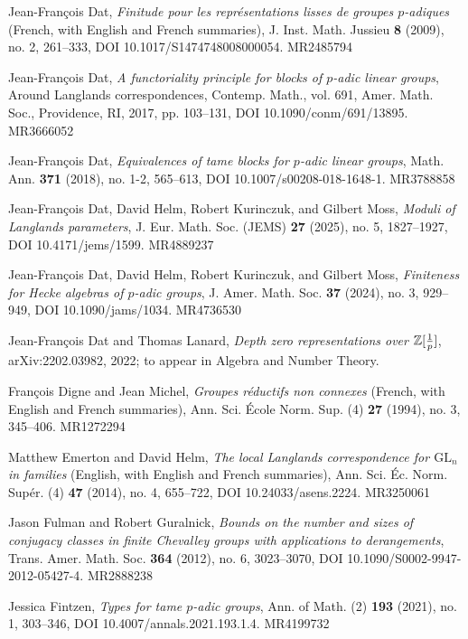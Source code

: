\begin{refs}
\item[{[Dat09]}] Jean-Fran\c{c}ois Dat, \emph{Finitude pour les repr\'esentations lisses de groupes $p$-adiques} (French, with English and French summaries), J. Inst. Math. Jussieu \textbf{8} (2009), no. 2, 261--333, DOI 10.1017/S1474748008000054. MR2485794
\item[{[Dat17]}] Jean-Fran\c{c}ois Dat, \emph{A functoriality principle for blocks of $p$-adic linear groups}, Around Langlands correspondences, Contemp. Math., vol. 691, Amer. Math. Soc., Providence, RI, 2017, pp. 103--131, DOI 10.1090/conm/691/13895. MR3666052
\item[{[Dat18]}] Jean-Fran\c{c}ois Dat, \emph{Equivalences of tame blocks for $p$-adic linear groups}, Math. Ann. \textbf{371} (2018), no. 1-2, 565--613, DOI 10.1007/s00208-018-1648-1. MR3788858
\item[{[DHKM20]}] Jean-Fran\c{c}ois Dat, David Helm, Robert Kurinczuk, and Gilbert Moss, \emph{Moduli of Langlands parameters}, J. Eur. Math. Soc. (JEMS) \textbf{27} (2025), no. 5, 1827--1927, DOI 10.4171/jems/1599. MR4889237
\item[{[DHKM24]}] Jean-Fran\c{c}ois Dat, David Helm, Robert Kurinczuk, and Gilbert Moss, \emph{Finiteness for Hecke algebras of $p$-adic groups}, J. Amer. Math. Soc. \textbf{37} (2024), no. 3, 929--949, DOI 10.1090/jams/1034. MR4736530
\item[{[DL22]}] Jean-Fran\c{c}ois Dat and Thomas Lanard, \emph{Depth zero representations over $\mathbb{Z}[\frac1p]$}, arXiv:2202.03982, 2022; to appear in Algebra and Number Theory.
\item[{[DM94]}] Fran\c{c}ois Digne and Jean Michel, \emph{Groupes r\'eductifs non connexes} (French, with English and French summaries), Ann. Sci. \'Ecole Norm. Sup. (4) \textbf{27} (1994), no. 3, 345--406. MR1272294
\item[{[EH14]}] Matthew Emerton and David Helm, \emph{The local Langlands correspondence for $\mathrm{GL}_n$ in families} (English, with English and French summaries), Ann. Sci. \'Ec. Norm. Sup\'er. (4) \textbf{47} (2014), no. 4, 655--722, DOI 10.24033/asens.2224. MR3250061
\item[{[FG12]}] Jason Fulman and Robert Guralnick, \emph{Bounds on the number and sizes of conjugacy classes in finite Chevalley groups with applications to derangements}, Trans. Amer. Math. Soc. \textbf{364} (2012), no. 6, 3023--3070, DOI 10.1090/S0002-9947-2012-05427-4. MR2888238
\item[{[Fin21]}] Jessica Fintzen, \emph{Types for tame $p$-adic groups}, Ann. of Math. (2) \textbf{193} (2021), no. 1, 303--346, DOI 10.4007/annals.2021.193.1.4. MR4199732

\end{refs}
